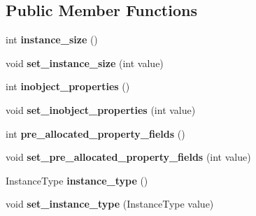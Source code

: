 \subsection*{Public Member Functions}
\begin{DoxyCompactItemize}
\item 
\hypertarget{classv8_1_1internal_1_1_map_a7cd69a3a08d04653aae1738f78cc7709}{}int {\bfseries instance\+\_\+size} ()\label{classv8_1_1internal_1_1_map_a7cd69a3a08d04653aae1738f78cc7709}

\item 
\hypertarget{classv8_1_1internal_1_1_map_ab062bb7dd38c7934406ae01bc2cc949d}{}void {\bfseries set\+\_\+instance\+\_\+size} (int value)\label{classv8_1_1internal_1_1_map_ab062bb7dd38c7934406ae01bc2cc949d}

\item 
\hypertarget{classv8_1_1internal_1_1_map_a5595da2c804a29371909ff7baa060304}{}int {\bfseries inobject\+\_\+properties} ()\label{classv8_1_1internal_1_1_map_a5595da2c804a29371909ff7baa060304}

\item 
\hypertarget{classv8_1_1internal_1_1_map_aceb8a18f024e29709bfe2b3f25636be0}{}void {\bfseries set\+\_\+inobject\+\_\+properties} (int value)\label{classv8_1_1internal_1_1_map_aceb8a18f024e29709bfe2b3f25636be0}

\item 
\hypertarget{classv8_1_1internal_1_1_map_a174d83da39d277b09879b8738a3c93d0}{}int {\bfseries pre\+\_\+allocated\+\_\+property\+\_\+fields} ()\label{classv8_1_1internal_1_1_map_a174d83da39d277b09879b8738a3c93d0}

\item 
\hypertarget{classv8_1_1internal_1_1_map_a98fa96e8c8ae4346ab53fb4dbb77cc8e}{}void {\bfseries set\+\_\+pre\+\_\+allocated\+\_\+property\+\_\+fields} (int value)\label{classv8_1_1internal_1_1_map_a98fa96e8c8ae4346ab53fb4dbb77cc8e}

\item 
\hypertarget{classv8_1_1internal_1_1_map_a9f71b0211d464eb94e16e239ec48b34f}{}Instance\+Type {\bfseries instance\+\_\+type} ()\label{classv8_1_1internal_1_1_map_a9f71b0211d464eb94e16e239ec48b34f}

\item 
\hypertarget{classv8_1_1internal_1_1_map_a6528f58e351f26d514de016ee80c48ad}{}void {\bfseries set\+\_\+instance\+\_\+type} (Instance\+Type value)\label{classv8_1_1internal_1_1_map_a6528f58e351f26d514de016ee80c48ad}


\end{DoxyCompactItemize}
